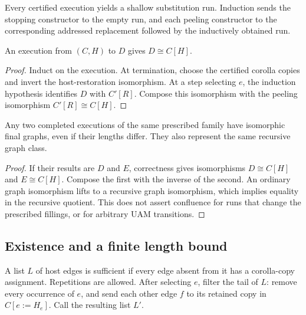Every certified execution yields a shallow substitution run. Induction
sends the stopping constructor to the empty run, and each peeling
constructor to the corresponding addressed replacement followed by the
inductively obtained run.

\begin{theorem}
An execution from $(C,H)$ to $D$ gives $D\cong C[H]$.
\end{theorem}
\begin{proof}
Induct on the execution. At termination, choose the certified corolla
copies and invert the host-restoration isomorphism.
At a step selecting $e$, the induction hypothesis identifies $D$ with
$C'[R]$. Compose this isomorphism with the peeling isomorphism
$C'[R]\cong C[H]$.
\end{proof}

\begin{theorem}
Any two completed executions of the same prescribed family have
isomorphic final graphs, even if their lengths differ. They also
represent the same recursive graph class.
\end{theorem}
\begin{proof}
If their results are $D$ and $E$, correctness gives isomorphisms
$D\cong C[H]$ and $E\cong C[H]$. Compose the first with the inverse of
the second. An ordinary graph isomorphism lifts to a recursive graph
isomorphism, which implies equality in the recursive quotient.
This does not assert confluence for runs that change the prescribed
fillings, or for arbitrary UAM transitions.
\end{proof}

\subsection{Existence and a finite length bound}
\begin{definition}
A list $L$ of host edges is sufficient if every edge absent from it has
a corolla-copy assignment. Repetitions are allowed.
After selecting $e$, filter the tail of $L$: remove every occurrence of
$e$, and send each other edge $f$ to its retained copy in $C[e:=H_e]$.
Call the resulting list $L'$.
\end{definition}

